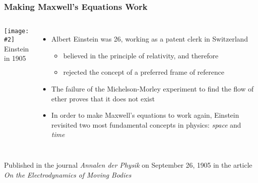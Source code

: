 \documentclass[12pt,compress,aspectratio=169]{beamer}
\newcommand{\pic}[2]{\texttt{[image: \#2]}}
\newcommand{\bigsqrt}{\ensuremath\sqrt{1-\left(\frac{v}{c}\right)^2}}
\newcommand{\lorentz}{\ensuremath\frac{1}{\bigsqrt}}
\newcommand{\eq}[2]{\vspace{#1}{\Large\begin{displaymath}#2\end{displaymath}}}
\begin{document}
%    
%    
%      

\begin{frame}
  \frametitle{Making Maxwell's Equations Work}
  \begin{columns}
    \pic{1.1}{graphics/Einstein_patentoffice.jpg}\\
    {\footnotesize Einstein in 1905}
  
    \begin{itemize}
    \item Albert Einstein was 26, working as a patent clerk in Switzerland
      \begin{itemize}
      \item believed in the principle of relativity, and therefore
      \item rejected the concept of a preferred frame of reference
      \end{itemize}
    \item The failure of the Michelson-Morley experiment to find the flow of
      ether proves that it does not exist
    \item In order to make Maxwell's equations to work again, Einstein
      revisited two most fundamental concepts in physics: \emph{space} and
      \emph{time}
    \end{itemize}
  \end{columns}

  \vspace{.15in}Published in the journal \emph{Annalen der Physik} on September
  26, 1905 in the article \emph{On the Electrodynamics of Moving Bodies}
\end{frame}
\end{document}
